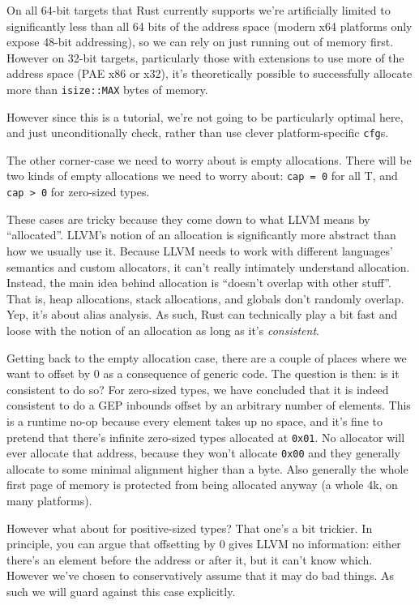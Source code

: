 \documentclass[a4paper,]{book}
\begin{document}
On all 64-bit targets that Rust currently supports we're artificially
limited to significantly less than all 64 bits of the address space
(modern x64 platforms only expose 48-bit addressing), so we can rely on
just running out of memory first. However on 32-bit targets,
particularly those with extensions to use more of the address space (PAE
x86 or x32), it's theoretically possible to successfully allocate more
than \texttt{isize::MAX} bytes of memory.

However since this is a tutorial, we're not going to be particularly
optimal here, and just unconditionally check, rather than use clever
platform-specific \texttt{cfg}s.

The other corner-case we need to worry about is empty allocations. There
will be two kinds of empty allocations we need to worry about:
\texttt{cap\ =\ 0} for all T, and \texttt{cap\ \textgreater{}\ 0} for
zero-sized types.

These cases are tricky because they come down to what LLVM means by
``allocated''. LLVM's notion of an allocation is significantly more
abstract than how we usually use it. Because LLVM needs to work with
different languages' semantics and custom allocators, it can't really
intimately understand allocation. Instead, the main idea behind
allocation is ``doesn't overlap with other stuff''. That is, heap
allocations, stack allocations, and globals don't randomly overlap. Yep,
it's about alias analysis. As such, Rust can technically play a bit fast
and loose with the notion of an allocation as long as it's
\emph{consistent}.

Getting back to the empty allocation case, there are a couple of places
where we want to offset by 0 as a consequence of generic code. The
question is then: is it consistent to do so? For zero-sized types, we
have concluded that it is indeed consistent to do a GEP inbounds offset
by an arbitrary number of elements. This is a runtime no-op because
every element takes up no space, and it's fine to pretend that there's
infinite zero-sized types allocated at \texttt{0x01}. No allocator will
ever allocate that address, because they won't allocate \texttt{0x00}
and they generally allocate to some minimal alignment higher than a
byte. Also generally the whole first page of memory is protected from
being allocated anyway (a whole 4k, on many platforms).

However what about for positive-sized types? That one's a bit trickier.
In principle, you can argue that offsetting by 0 gives LLVM no
information: either there's an element before the address or after it,
but it can't know which. However we've chosen to conservatively assume
that it may do bad things. As such we will guard against this case
explicitly.
\end{document}

